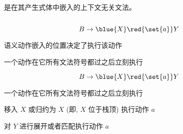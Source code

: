
\begin{frame}{}
  \begin{definition}
     是在其产生式体中嵌入的上下文无关文法。
  \end{definition}

  \vspace{0.30cm}
  \begin{columns}
  \end{columns}
\end{frame}

\begin{frame}{}
  \begin{center}


  \end{center}
\end{frame}

\begin{frame}{}
  \[
    B \to \blue{X} \red{\set{a}} Y
  \]

  \vspace{0.30cm}
  \begin{center}
    \pause

    \pause
    \vspace{1.00cm}
    语义动作嵌入的位置决定了执行该动作

    \vspace{0.60cm}
     一个动作在它所有文法符号都过之后立刻执行
  \end{center}
\end{frame}

\begin{frame}{}
  \[
    B \to \blue{X} \red{\set{a}} Y
  \]

  \vspace{0.30cm}
   一个动作在它所有文法符号都过之后立刻执行

  \pause
  \vspace{0.80cm}
  \begin{description}
    \setlength{\itemsep}{20pt}
    \item[自底向上:] 移入 $X$ 或归约为 $X$  (即, $X$ 位于栈顶) 执行动作 $a$
    \pause
    \item[自顶向下:] 对 $Y$ 进行展开或者匹配执行动作 $a$
  \end{description}
\end{frame}

